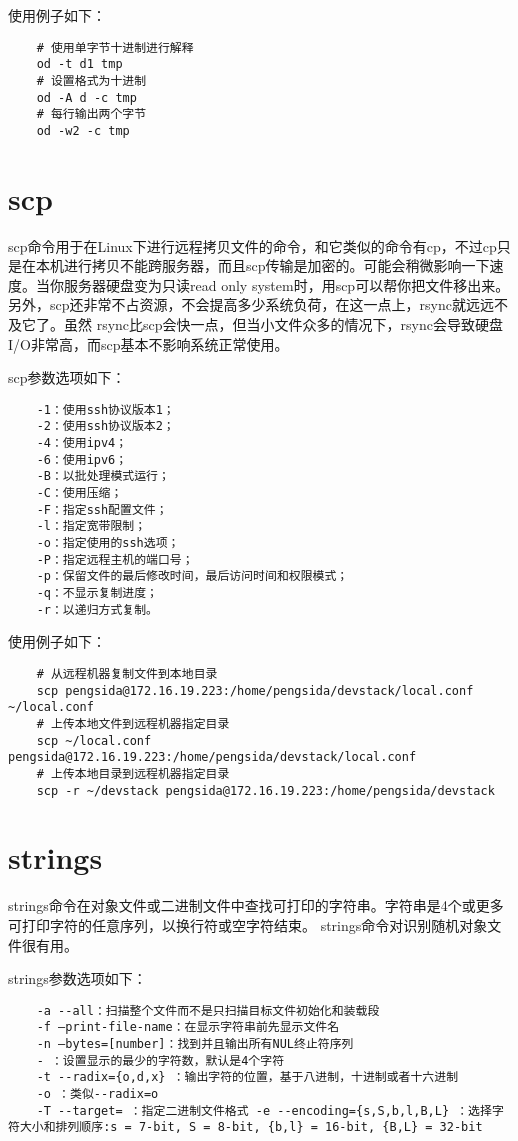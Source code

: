 \documentclass[a4paper,left=2.5cm,right=2.5cm,11pt]{article}
\begin{document}
	使用例子如下：
	\begin{lstlisting}
	# 使用单字节十进制进行解释
	od -t d1 tmp
	# 设置格式为十进制
	od -A d -c tmp
	# 每行输出两个字节
	od -w2 -c tmp
	\end{lstlisting}

\section{scp}
	scp命令用于在Linux下进行远程拷贝文件的命令，和它类似的命令有cp，不过cp只是在本机进行拷贝不能跨服务器，而且scp传输是加密的。可能会稍微影响一下速度。当你服务器硬盘变为只读read only system时，用scp可以帮你把文件移出来。另外，scp还非常不占资源，不会提高多少系统负荷，在这一点上，rsync就远远不及它了。虽然 rsync比scp会快一点，但当小文件众多的情况下，rsync会导致硬盘I/O非常高，而scp基本不影响系统正常使用。\par

	scp参数选项如下：
	\begin{lstlisting}
	-1：使用ssh协议版本1； 
	-2：使用ssh协议版本2； 
	-4：使用ipv4； 
	-6：使用ipv6； 
	-B：以批处理模式运行； 
	-C：使用压缩； 
	-F：指定ssh配置文件； 
	-l：指定宽带限制； 
	-o：指定使用的ssh选项； 
	-P：指定远程主机的端口号； 
	-p：保留文件的最后修改时间，最后访问时间和权限模式； 
	-q：不显示复制进度； 
	-r：以递归方式复制。
	\end{lstlisting}

	使用例子如下：
	\begin{lstlisting}
	# 从远程机器复制文件到本地目录
	scp pengsida@172.16.19.223:/home/pengsida/devstack/local.conf ~/local.conf
	# 上传本地文件到远程机器指定目录
	scp ~/local.conf pengsida@172.16.19.223:/home/pengsida/devstack/local.conf
	# 上传本地目录到远程机器指定目录
	scp -r ~/devstack pengsida@172.16.19.223:/home/pengsida/devstack
	\end{lstlisting}

\section{strings}
	strings命令在对象文件或二进制文件中查找可打印的字符串。字符串是4个或更多可打印字符的任意序列，以换行符或空字符结束。 strings命令对识别随机对象文件很有用。\par

	strings参数选项如下：
	\begin{lstlisting}
	-a --all：扫描整个文件而不是只扫描目标文件初始化和装载段 
	-f –print-file-name：在显示字符串前先显示文件名 
	-n –bytes=[number]：找到并且输出所有NUL终止符序列 
	- ：设置显示的最少的字符数，默认是4个字符 
	-t --radix={o,d,x} ：输出字符的位置，基于八进制，十进制或者十六进制 
	-o ：类似--radix=o 
	-T --target= ：指定二进制文件格式 -e --encoding={s,S,b,l,B,L} ：选择字符大小和排列顺序:s = 7-bit, S = 8-bit, {b,l} = 16-bit, {B,L} = 32-bit
	\end{lstlisting}
\end{document}
